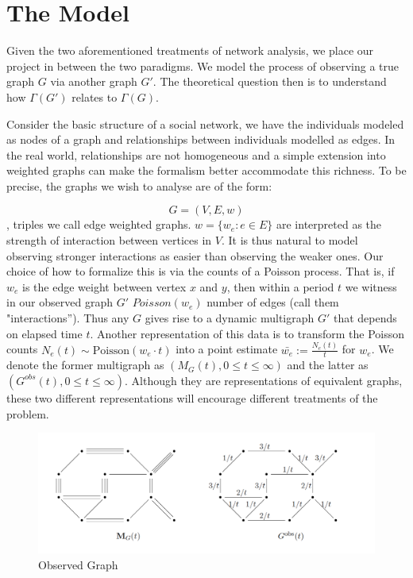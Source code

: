\section{The Model}

Given the two aforementioned treatments of network analysis, we place our project in between the two paradigms.  We model the process of observing a true graph $G$ via another graph $G'$.  The theoretical question then is to understand how $\Gamma(G')$ relates to $\Gamma(G)$.  


Consider the basic structure of a social network, we have the individuals modeled as nodes of a graph and relationships between individuals modelled as edges.  In the real world, relationships are not homogeneous and a simple extension into weighted graphs can make the formalism  better accommodate this richness.  To be precise, the graphs we wish to analyse are of the form:

$$ G=(V, E, w)$$, triples we call edge weighted graphs.  $w = \{w_e: e\in E \}$ are interpreted as the strength of interaction between vertices in $V$. It is thus natural to model observing stronger interactions as easier than observing the weaker ones.  Our choice of how to formalize this is via the counts of a Poisson process.  That is, if $w_e$ is the edge weight between vertex $x$ and $y$, then within a period $t$ we witness in our observed graph $G'$ $Poisson(w_e)$ number of edges (call them "interactions'').  Thus any $G$ gives rise to a dynamic multigraph $G'$ that depends on elapsed time $t$.  Another representation of this data is to transform the Poisson counts $N_e(t)\sim \text{Poisson}(w_e\cdot t)$ into a point estimate $\bar{w_e}:=\frac{N_e(t)}{t}$ for $w_e$.  We denote the former multigraph as $(M_G(t), 0 \leq t \leq \infty)$ and the latter as $(G^{obs}(t), 0 \leq t \leq \infty)$. Although they are representations of equivalent graphs, these two different representations will encourage different treatments of the problem.  
\begin{figure}
\begin{center}
  \includegraphics[scale=0.75]{Gobsrep}
  \caption{Observed Graph}
  \label{fig:gobsrep}
 \end{center}
\end{figure}


